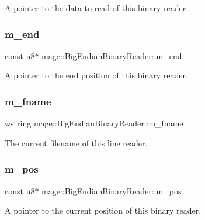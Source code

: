 A pointer to the data to read of this binary reader. \hypertarget{classmage_1_1_big_endian_binary_reader_a6a11e76de21a40a009aa01096ba71058}{}\label{classmage_1_1_big_endian_binary_reader_a6a11e76de21a40a009aa01096ba71058} 
\subsubsection{\texorpdfstring{m\+\_\+end}{m\_end}}
{\footnotesize\ttfamily const \hyperlink{namespacemage_a5a362e2d56fc439362a80516ecae7828}{u8}$\ast$ mage\+::\+Big\+Endian\+Binary\+Reader\+::m\+\_\+end\hspace{0.3cm}{\ttfamily [private]}}

A pointer to the end position of this binary reader. \hypertarget{classmage_1_1_big_endian_binary_reader_a0f836aec582a59f156b64bffb9653e41}{}\label{classmage_1_1_big_endian_binary_reader_a0f836aec582a59f156b64bffb9653e41} 
\subsubsection{\texorpdfstring{m\+\_\+fname}{m\_fname}}
{\footnotesize\ttfamily wstring mage\+::\+Big\+Endian\+Binary\+Reader\+::m\+\_\+fname\hspace{0.3cm}{\ttfamily [private]}}

The current filename of this line reader. \hypertarget{classmage_1_1_big_endian_binary_reader_aa65fd106fc7b4f66ead8e26d06179ff2}{}\label{classmage_1_1_big_endian_binary_reader_aa65fd106fc7b4f66ead8e26d06179ff2} 
\subsubsection{\texorpdfstring{m\+\_\+pos}{m\_pos}}
{\footnotesize\ttfamily const \hyperlink{namespacemage_a5a362e2d56fc439362a80516ecae7828}{u8}$\ast$ mage\+::\+Big\+Endian\+Binary\+Reader\+::m\+\_\+pos\hspace{0.3cm}{\ttfamily [private]}}

A pointer to the current position of this binary reader. 